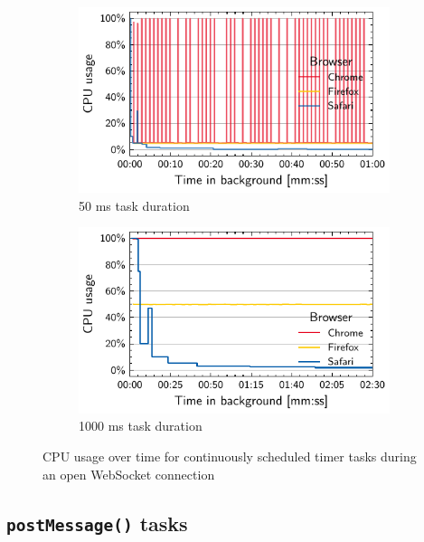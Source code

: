 \documentclass[article,type=bsc,colorback,accentcolor=tud9c]{tudthesis}
\begin{document}
  \begin{figure}
    \begin{subfigure}[t]{0.45\textwidth}
      \includegraphics[width=\textwidth]{images/websocket-50.pdf}
      \caption{50 ms task duration}
    \end{subfigure}
    \hfill
    \begin{subfigure}[t]{0.45\textwidth}
      \includegraphics[width=\textwidth]{images/websocket-1000.pdf}
      \caption{1000 ms task duration}
    \end{subfigure}

    \caption{CPU usage over time for continuously scheduled timer tasks during an open WebSocket connection}
    \label{fig:websocket}
  \end{figure}


  \subsection{\texttt{postMessage()} tasks}
\end{document}
